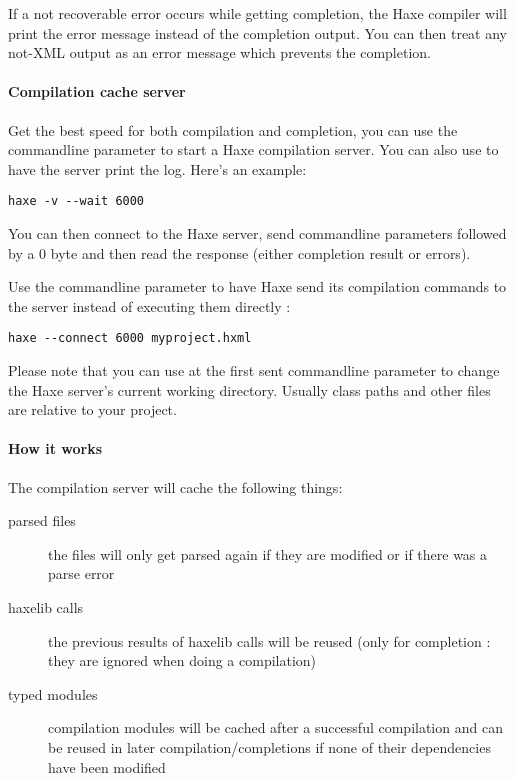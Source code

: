 If a not recoverable error occurs while getting completion, the Haxe compiler will print the error message instead of the completion output. You can then treat any not-XML output as an error message which prevents the completion.

\paragraph{Compilation cache server}

Get the best speed for both compilation and completion, you can use the  commandline parameter to start a Haxe compilation server. You can also use  to have the server print the log. Here's an example:

\begin{lstlisting}
haxe -v --wait 6000
\end{lstlisting}

You can then connect to the Haxe server, send commandline parameters followed by a 0 byte and then read the response (either completion result or errors).

Use the  commandline parameter to have Haxe send its compilation commands to the server instead of executing them directly :

\begin{lstlisting}
haxe --connect 6000 myproject.hxml
\end{lstlisting}

Please note that you can use  at the first sent commandline parameter to change the Haxe server's current working directory. Usually class paths and other files are relative to your project.

\paragraph{How it works}
The compilation server will cache the following things:

\begin{description}
	\item[parsed files] the files will only get parsed again if they are modified or if there was a parse error
	\item[haxelib calls] the previous results of haxelib calls will be reused (only for completion : they are ignored when doing a compilation)
	\item[typed modules] compilation modules will be cached after a successful compilation and can be reused in later compilation/completions if none of their dependencies have been modified
\end{description}

